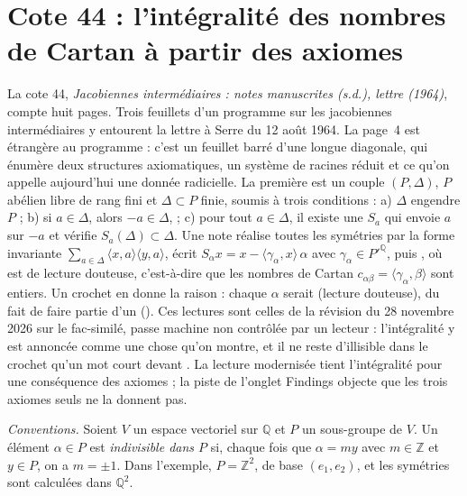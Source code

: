 \section[Cote 44 : l'intégralité des nombres de Cartan à partir des axiomes]{Cote 44 : l'intégralité des nombres de Cartan à partir des axiomes\protect{}}\label{sec:44}

La cote 44, \emph{Jacobiennes intermédiaires : notes manuscrites (s.d.), lettre (1964)}, compte huit pages. Trois feuillets d'un programme sur les jacobiennes intermédiaires y entourent la lettre à Serre du 12 août 1964. La page~4 est étrangère au programme : c'est un feuillet barré d'une longue diagonale, qui énumère deux structures axiomatiques, un système de racines réduit et ce qu'on appelle aujourd'hui une donnée radicielle. La première est un couple $(P, \Delta)$, $P$ abélien libre de rang fini et $\Delta \subset P$ finie, soumis à trois conditions : a) $\Delta$ engendre $P$ ; b) si $a \in \Delta$, alors $-a \in \Delta$,  ; c) pour tout $a \in \Delta$, il existe une  $S_a$ qui envoie $a$ sur $-a$ et vérifie $S_a(\Delta) \subset \Delta$. Une note réalise toutes les symétries par la forme invariante $\sum_{a \in \Delta} \langle x, a\rangle\langle y, a\rangle$, écrit $S_\alpha x = x - \langle\gamma_\alpha, x\rangle\,\alpha$ avec $\gamma_\alpha \in P'^{\mathbb Q}$, puis , où  est de lecture douteuse, c'est-à-dire que les nombres de Cartan $c_{\alpha\beta} = \langle\gamma_\alpha, \beta\rangle$ sont entiers. Un crochet en donne la raison : chaque $\alpha$ serait  (lecture douteuse), du fait de faire partie d'un  (). Ces lectures sont celles de la révision du 28 novembre 2026 sur le fac-similé, passe machine non contrôlée par un lecteur : l'intégralité y est annoncée comme une chose qu'on montre, et il ne reste d'illisible dans le crochet qu'un mot court devant . La lecture modernisée tient l'intégralité pour une conséquence des axiomes ; la piste de l'onglet Findings objecte que les trois axiomes seuls ne la donnent pas.

\noindent\emph{Conventions.} Soient $V$ un espace vectoriel sur $\mathbb Q$ et $P$ un sous-groupe de $V$. Un élément $\alpha \in P$ est \emph{indivisible dans $P$} si, chaque fois que $\alpha = m y$ avec $m \in \mathbb Z$ et $y \in P$, on a $m = \pm 1$. Dans l'exemple, $P = \mathbb Z^2$, de base $(e_1, e_2)$, et les symétries sont calculées dans $\mathbb Q^2$.

